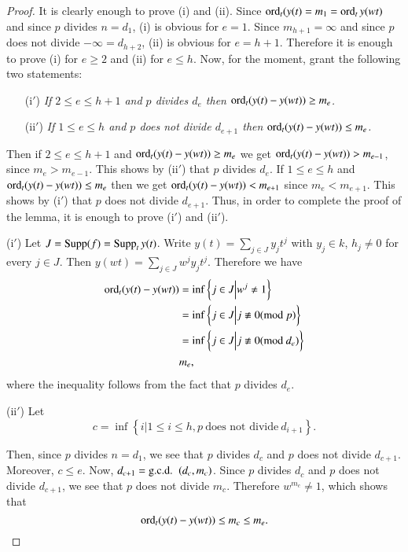 \begin{proof}
  It is clearly enough to prove (i) and (ii). Since $\ord_t (y(t)=m_1= \ord_t y (wt)$ and since $p$ divides $n= d_1$, (i) is obvious for $e=1$. Since $m_{h+1}= \infty$ and since $p$\pageoriginale does not divide $- \infty = d_{h+2}$, (ii) is obvious for $e= h+1$. Therefore it is enough to prove (i) for $e \geq 2$ and (ii) for $e \leq h$. Now, for the moment, grant the following two statements:
\begin{enumerate}
\item[(i$'$)] {\em If $2 \leq e \leq h+1$ and $p$ divides $d_e$ then $\ord_t(y(t)- y(wt)) \geq m_e$.}

\item[(ii$'$)] {\em If $1 \leq e \leq h$ and $p$  does not divide $d_{e+1}$ then $\ord_t (y(t) - y(wt))\leq m_e$.}  
\end{enumerate}
Then if $2 \leq e \leq h+1$ and $\ord_t(y(t)- y(wt))\geq m_e$ we get $\ord_t(y(t)- y(wt))> m_{e-1}$, since $m_e > m_{e-1}$. This shows by (ii$'$) that $p$ divides $d_e$. If $1 \leq e \leq h$ and $\ord_t (y(t)- y (wt))\leq m_e$ then we get $\ord_t (y(t)- y(wt))< m_{e+1}$ since $m_e < m_{e+1}$. This shows by (i$'$) that $p$ does not divide $d_{e+1}$. Thus, in order to complete the proof of the lemma, it is enough to prove (i$'$) and (ii$'$).

(i$'$) Let $J= \Supp (f)= \Supp_t y(t)$. Write $y(t)= \displaystyle{\sum_{j \in J}y_j t^j}$ with $y_j \in k$, $h_j \neq 0$ for every $j \in J$. Then $y(wt)= \displaystyle{\sum_{j \in J}} w^jy_j t^j$. Therefore we have
\begin{align*}
\ord_t (y(t)- y (wt)) & = \inf \left\{ j \in J \Big| w^j \neq 1 \right\}\\
& = \inf \left\{ j \in J \Big| j \not\equiv 0 (\text{mod } p) \right\}\\
& = \inf \left\{ j \in J \Big| j \not\equiv 0 (\text{mod } d_e)\right\}\\
& m_e,
\end{align*}
where the inequality follows from the fact that $p$ divides $d_e$.

(ii$'$) Let 
$$
c = \inf \left\{ i \Big| 1 \leq i \leq h, p ~\text{does not divide}~ d_{i+1}\right\}.
$$

Then, since $p$ divides $n= d_1$, we see that $p$ divides $d_c$ and $p$ does not divide $d_{c+1}$. Moreover, $c \leq e$. Now, $d_{c+1}= \text{\gcd}~ (d_c, m_c)$. Since $p$ divides $d_c$ and $p$ does not divide $d_{c+1}$, we see that $p$ does not divide $m_c$. Therefore $w^{m_c}\neq 1$, which shows that
$$
\ord_t (y(t)- y(wt)) \leq m_c \leq m_e.
$$
\end{proof}

